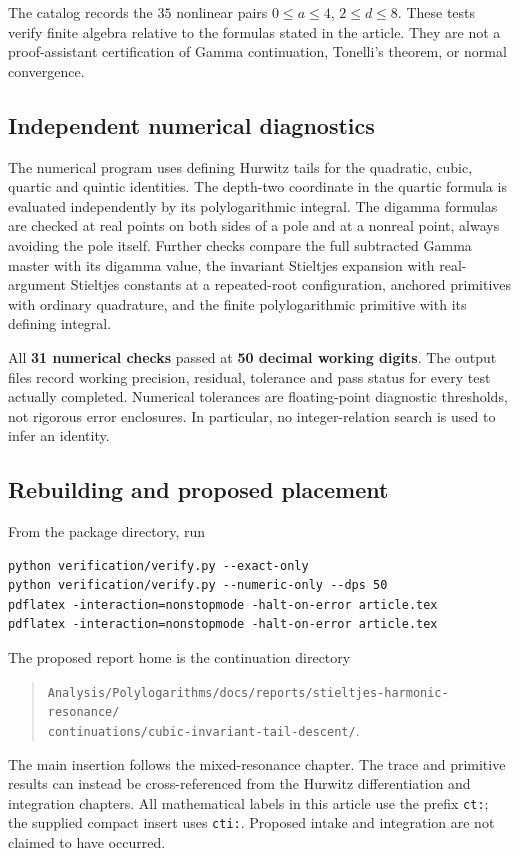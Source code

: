 \documentclass[11pt]{article}
\numberwithin{equation}{section}
\theoremstyle{definition}\newtheorem{definition}[theorem]{Definition}
\theoremstyle{remark}\newtheorem{remark}[theorem]{Remark}
\newcommand{\src}[1]{\nolinkurl{#1}}
\begin{document}
The catalog records the $35$ nonlinear pairs $0\le a\le4$, $2\le d\le8$.
These tests verify finite algebra relative to the formulas stated in the
article. They are not a proof-assistant certification of Gamma continuation,
Tonelli's theorem, or normal convergence.

\subsection{Independent numerical diagnostics}
The numerical program uses defining Hurwitz tails for the quadratic,
cubic, quartic and quintic identities. The depth-two coordinate in the
quartic formula is evaluated independently by its polylogarithmic integral.
The digamma formulas are checked at real points on both sides of a pole
and at a nonreal point, always avoiding the pole itself. Further checks
compare the full subtracted Gamma master with its digamma value, the
invariant Stieltjes expansion with real-argument Stieltjes constants at a
repeated-root configuration, anchored primitives with ordinary quadrature,
and the finite polylogarithmic primitive with its defining integral.

All \textbf{31 numerical checks} passed at \textbf{50 decimal working digits}.
The output files record working precision, residual, tolerance and pass
status for every test actually completed. Numerical tolerances are
floating-point diagnostic thresholds, not rigorous error enclosures.
In particular, no integer-relation search is used to infer an identity.

\subsection{Rebuilding and proposed placement}
From the package directory, run
\par\medskip\noindent\begin{minipage}{\linewidth}
\begin{verbatim}
python verification/verify.py --exact-only
python verification/verify.py --numeric-only --dps 50
pdflatex -interaction=nonstopmode -halt-on-error article.tex
pdflatex -interaction=nonstopmode -halt-on-error article.tex
\end{verbatim}
\end{minipage}
\par\medskip
The proposed report home is the continuation directory
\begin{quote}\small
\src{Analysis/Polylogarithms/docs/reports/stieltjes-harmonic-resonance/}\\
\src{continuations/cubic-invariant-tail-descent/}.
\end{quote}
The main insertion follows the mixed-resonance chapter. The
trace and primitive results can instead
be cross-referenced from the Hurwitz differentiation and integration
chapters. All mathematical labels in this article use the prefix
\src{ct:}; the supplied compact insert uses \src{cti:}. Proposed intake and
integration are not claimed to have occurred.
\end{document}
